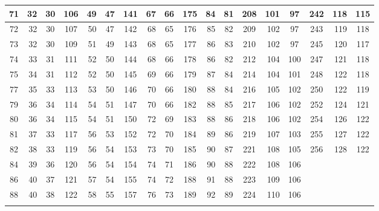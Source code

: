 \documentclass{article}
\theoremstyle{definition}
\theoremstyle{remark}
\begin{document}
\begin{table}[p]
{\begin{minipage}{0.92\textheight}
{\begin{tabular}{c|r|c||c|r|c||c|r|c||c|r|c||c|r|c||c|r|c}
\hline
71 & 32 & 30 & 106 & 49 & 47 & 141 & 67 & 66 & 175 & 84 & 81 & 208 & 101 & 97 & 242 & 118 & 115\\
\hline
72 & 32 & 30 & 107 & 50 & 47 & 142 & 68 & 65 & 176 & 85 & 82 & 209 & 102 & 97 & 243 & 119 & 118\\
\hline
73 & 32 & 30 & 109 & 51 & 49 & 143 & 68 & 65 & 177 & 86 & 83 & 210 & 102 & 97 & 245 & 120 & 117\\
\hline
74 & 33 & 31 & 111 & 52 & 50 & 144 & 68 & 66 & 178 & 86 & 82 & 212 & 104 & 100 & 247 & 121 & 118\\
\hline
75 & 34 & 31 & 112 & 52 & 50 & 145 & 69 & 66 & 179 & 87 & 84 & 214 & 104 & 101 & 248 & 122 & 118\\
\hline
77 & 35 & 33 & 113 & 53 & 50 & 146 & 70 & 66 & 180 & 88 & 84 & 216 & 105 & 102 & 250 & 122 & 119\\
\hline
79 & 36 & 34 & 114 & 54 & 51 & 147 & 70 & 66 & 182 & 88 & 85 & 217 & 106 & 102 & 252 & 124 & 121\\
\hline
80 & 36 & 34 & 115 & 54 & 51 & 150 & 72 & 69 & 183 & 88 & 86 & 218 & 106 & 102 & 254 & 126 & 122\\
\hline
81 & 37 & 33 & 117 & 56 & 53 & 152 & 72 & 70 & 184 & 89 & 86 & 219 & 107 & 103 & 255 & 127 & 122\\
\hline
82 & 38 & 33 & 119 & 56 & 54 & 153 & 73 & 70 & 185 & 90 & 87 & 221 & 108 & 105 & 256 & 128 & 122\\
\hline
84 & 39 & 36 & 120 & 56 & 54 & 154 & 74 & 71 & 186 & 90 & 88 & 222 & 108 & 106 &  &  & \\
\hline
86 & 40 & 37 & 121 & 57 & 54 & 155 & 74 & 72 & 188 & 91 & 88 & 223 & 109 & 106 &  &  & \\
\hline
88 & 40 & 38 & 122 & 58 & 55 & 157 & 76 & 73 & 189 & 92 & 89 & 224 & 110 & 106 &  &  & \\
\Xhline{2\arrayrulewidth}
\end{tabular}%
}
\end{minipage}%
}
\end{table}
\end{document}
